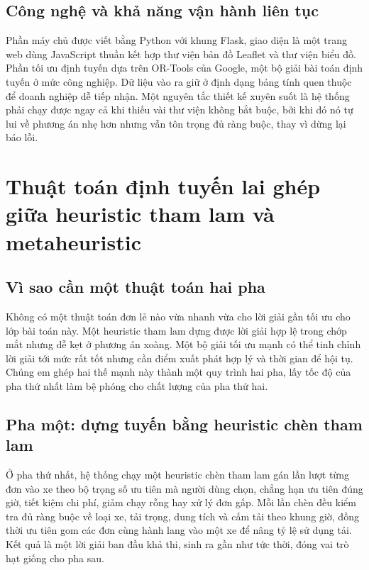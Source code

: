 \documentclass[12pt,a4paper,oneside]{report}
\begin{document}
\section{Công nghệ và khả năng vận hành liên tục}
Phần máy chủ được viết bằng Python với khung Flask, giao diện là một trang web dùng JavaScript thuần kết hợp thư viện bản đồ Leaflet và thư viện biểu đồ. Phần tối ưu định tuyến dựa trên OR-Tools của Google, một bộ giải bài toán định tuyến ở mức công nghiệp. Dữ liệu vào ra giữ ở định dạng bảng tính quen thuộc để doanh nghiệp dễ tiếp nhận. Một nguyên tắc thiết kế xuyên suốt là hệ thống phải chạy được ngay cả khi thiếu vài thư viện không bắt buộc, bởi khi đó nó tự lui về phương án nhẹ hơn nhưng vẫn tôn trọng đủ ràng buộc, thay vì dừng lại báo lỗi.

\chapter{Thuật toán định tuyến lai ghép giữa heuristic tham lam và metaheuristic}

\section{Vì sao cần một thuật toán hai pha}
Không có một thuật toán đơn lẻ nào vừa nhanh vừa cho lời giải gần tối ưu cho lớp bài toán này. Một heuristic tham lam dựng được lời giải hợp lệ trong chớp mắt nhưng dễ kẹt ở phương án xoàng. Một bộ giải tối ưu mạnh có thể tinh chỉnh lời giải tới mức rất tốt nhưng cần điểm xuất phát hợp lý và thời gian để hội tụ. Chúng em ghép hai thế mạnh này thành một quy trình hai pha, lấy tốc độ của pha thứ nhất làm bệ phóng cho chất lượng của pha thứ hai.

\section{Pha một: dựng tuyến bằng heuristic chèn tham lam}
Ở pha thứ nhất, hệ thống chạy một heuristic chèn tham lam gán lần lượt từng đơn vào xe theo bộ trọng số ưu tiên mà người dùng chọn, chẳng hạn ưu tiên đúng giờ, tiết kiệm chi phí, giảm chạy rỗng hay xử lý đơn gấp. Mỗi lần chèn đều kiểm tra đủ ràng buộc về loại xe, tải trọng, dung tích và cấm tải theo khung giờ, đồng thời ưu tiên gom các đơn cùng hành lang vào một xe để nâng tỷ lệ sử dụng tải. Kết quả là một lời giải ban đầu khả thi, sinh ra gần như tức thời, đóng vai trò hạt giống cho pha sau.
\end{document}
